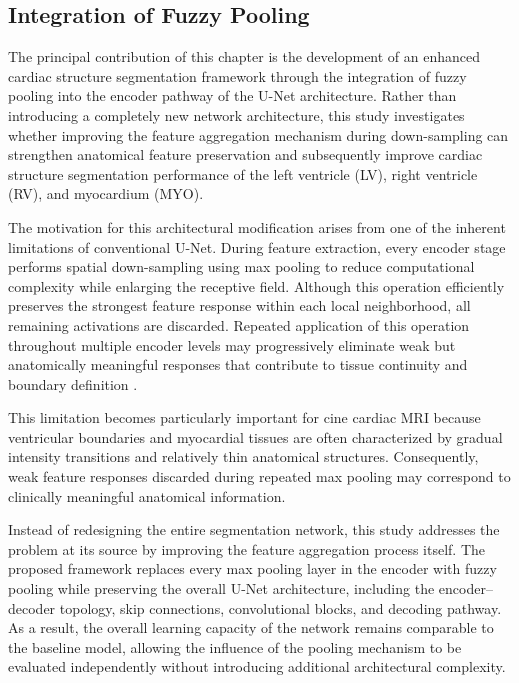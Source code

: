 \subsection{Integration of Fuzzy Pooling}
\label{subsec:ch4-fuzzy}

The principal contribution of this chapter is the development of an enhanced cardiac structure segmentation framework through the integration of fuzzy pooling into the encoder pathway of the U-Net architecture. Rather than introducing a completely new network architecture, this study investigates whether improving the feature aggregation mechanism during down-sampling can strengthen anatomical feature preservation and subsequently improve cardiac structure segmentation performance of the left ventricle (LV), right ventricle (RV), and myocardium (MYO).

The motivation for this architectural modification arises from one of the inherent limitations of conventional U-Net. During feature extraction, every encoder stage performs spatial down-sampling using max pooling to reduce computational complexity while enlarging the receptive field. Although this operation efficiently preserves the strongest feature response within each local neighborhood, all remaining activations are discarded. Repeated application of this operation throughout multiple encoder levels may progressively eliminate weak but anatomically meaningful responses that contribute to tissue continuity and boundary definition \citep{Nirthika2022}.

This limitation becomes particularly important for cine cardiac MRI because ventricular boundaries and myocardial tissues are often characterized by gradual intensity transitions and relatively thin anatomical structures. Consequently, weak feature responses discarded during repeated max pooling may correspond to clinically meaningful anatomical information.

Instead of redesigning the entire segmentation network, this study addresses the problem at its source by improving the feature aggregation process itself. The proposed framework replaces every max pooling layer in the encoder with fuzzy pooling while preserving the overall U-Net architecture, including the encoder--decoder topology, skip connections, convolutional blocks, and decoding pathway. As a result, the overall learning capacity of the network remains comparable to the baseline model, allowing the influence of the pooling mechanism to be evaluated independently without introducing additional architectural complexity.


